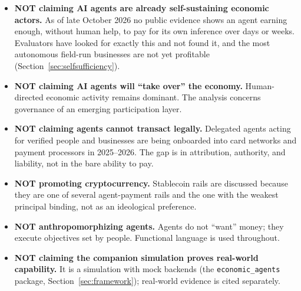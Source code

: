 \documentclass[11pt,letterpaper]{article}
\begin{document}
\begin{contextbox}
\begin{itemize}
  \item \textbf{NOT claiming AI agents are already self-sustaining economic actors.} As of late October 2026 no public evidence shows an agent earning enough, without human help, to pay for its own inference over days or weeks. Evaluators have looked for exactly this and not found it, and the most autonomous field-run businesses are not yet profitable (Section~\ref{sec:selfsufficiency}).
  \item \textbf{NOT claiming AI agents will ``take over'' the economy.} Human-directed economic activity remains dominant. The analysis concerns governance of an emerging participation layer.
  \item \textbf{NOT claiming agents cannot transact legally.} Delegated agents acting for verified people and businesses are being onboarded into card networks and payment processors in 2025--2026. The gap is in attribution, authority, and liability, not in the bare ability to pay.
  \item \textbf{NOT promoting cryptocurrency.} Stablecoin rails are discussed because they are one of several agent-payment rails and the one with the weakest principal binding, not as an ideological preference.
  \item \textbf{NOT anthropomorphizing agents.} Agents do not ``want'' money; they execute objectives set by people. Functional language is used throughout.
  \item \textbf{NOT claiming the companion simulation proves real-world capability.} It is a simulation with mock backends (the \texttt{economic\_agents} package, Section~\ref{sec:framework}); real-world evidence is cited separately.
\end{itemize}
\end{contextbox}

\vspace{0.3cm}
\end{document}

